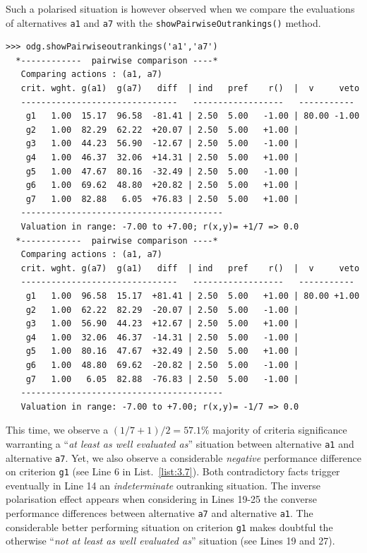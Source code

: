 Such a polarised situation is however observed when we compare the evaluations of alternatives \texttt{a1} and \texttt{a7} with the \texttt{showPairwiseOutrankings()} method. 
\begin{lstlisting}[caption={Pairwise comparison with considerable performance difference},label=list:3.7,basicstyle=\ttfamily\scriptsize]
>>> odg.showPairwiseoutrankings('a1','a7')
  *------------  pairwise comparison ----*
   Comparing actions : (a1, a7)
   crit. wght. g(a1)  g(a7)   diff  | ind   pref    r()  |  v     veto
   -------------------------------   ------------------   -----------
    g1   1.00  15.17  96.58  -81.41 | 2.50  5.00   -1.00 | 80.00 -1.00
    g2   1.00  82.29  62.22  +20.07 | 2.50  5.00   +1.00 | 
    g3   1.00  44.23  56.90  -12.67 | 2.50  5.00   -1.00 | 
    g4   1.00  46.37  32.06  +14.31 | 2.50  5.00   +1.00 | 
    g5   1.00  47.67  80.16  -32.49 | 2.50  5.00   -1.00 | 
    g6   1.00  69.62  48.80  +20.82 | 2.50  5.00   +1.00 | 
    g7   1.00  82.88   6.05  +76.83 | 2.50  5.00   +1.00 | 
   ----------------------------------------
   Valuation in range: -7.00 to +7.00; r(x,y)= +1/7 => 0.0
  *------------  pairwise comparison ----*
   Comparing actions : (a1, a7)
   crit. wght. g(a7)  g(a1)   diff  | ind   pref    r()  |  v     veto
   -------------------------------   ------------------   -----------
    g1   1.00  96.58  15.17  +81.41 | 2.50  5.00   +1.00 | 80.00 +1.00
    g2   1.00  62.22  82.29  -20.07 | 2.50  5.00   -1.00 | 
    g3   1.00  56.90  44.23  +12.67 | 2.50  5.00   +1.00 | 
    g4   1.00  32.06  46.37  -14.31 | 2.50  5.00   -1.00 | 
    g5   1.00  80.16  47.67  +32.49 | 2.50  5.00   +1.00 | 
    g6   1.00  48.80  69.62  -20.82 | 2.50  5.00   -1.00 | 
    g7   1.00   6.05  82.88  -76.83 | 2.50  5.00   -1.00 | 
   ----------------------------------------
   Valuation in range: -7.00 to +7.00; r(x,y)= -1/7 => 0.0
\end{lstlisting}

This time, we observe a $(1/7 + 1)/2 = 57.1\%$ majority of criteria significance warranting a ``\emph{at least as well evaluated as}'' situation between alternative \texttt{a1} and alternative \texttt{a7}. Yet, we also observe a considerable \emph{negative} performance difference on criterion \texttt{g1} (see Line 6 in List.~\vref{list:3.7}). Both contradictory facts trigger eventually in Line 14 an \emph{indeterminate} outranking situation. The inverse polarisation effect appears when considering in Lines 19-25 the converse performance differences between alternative \texttt{a7} and alternative \texttt{a1}. The considerable better performing situation on criterion \texttt{g1} makes doubtful the otherwise ``\emph{not at least as well evaluated as}'' situation (see Lines 19 and 27).

